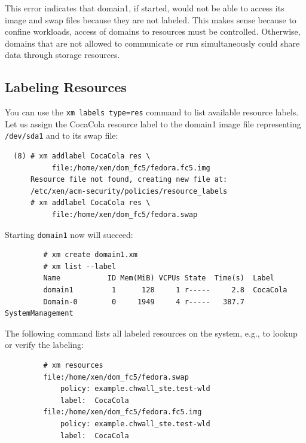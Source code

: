 \documentclass[11pt,twoside,final,openright]{report}
\begin{document}
This error indicates that domain1, if started, would not be able to
access its image and swap files because they are not labeled.  This
makes sense because to confine workloads, access of domains to
resources must be controlled.  Otherwise, domains that are not allowed
to communicate or run simultaneously could share data through storage
resources.

\subsection{Labeling Resources}
\label{subsection:acmexamplelabelresources}
You can use the \verb|xm labels type=res| command to list available
resource labels. Let us assign the CocaCola resource label to the domain1
image file representing \verb|/dev/sda1| and to its swap file:

\begin{verbatim}
  (8) # xm addlabel CocaCola res \
           file:/home/xen/dom_fc5/fedora.fc5.img
      Resource file not found, creating new file at:
      /etc/xen/acm-security/policies/resource_labels
      # xm addlabel CocaCola res \
           file:/home/xen/dom_fc5/fedora.swap
\end{verbatim}

Starting \verb|domain1| now will succeed:

\begin{scriptsize}
\begin{verbatim}
         # xm create domain1.xm
         # xm list --label
         Name           ID Mem(MiB) VCPUs State  Time(s)  Label
         domain1         1      128     1 r-----     2.8  CocaCola
         Domain-0        0     1949     4 r-----   387.7  SystemManagement
\end{verbatim}
\end{scriptsize}

The following command lists all labeled resources on the
system, e.g., to lookup or verify the labeling:

\begin{scriptsize}
\begin{verbatim}
         # xm resources
         file:/home/xen/dom_fc5/fedora.swap
             policy: example.chwall_ste.test-wld
             label:  CocaCola
         file:/home/xen/dom_fc5/fedora.fc5.img
             policy: example.chwall_ste.test-wld
             label:  CocaCola
\end{verbatim}
\end{scriptsize}
\end{document}
